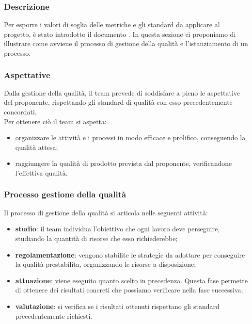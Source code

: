 \subsubsection{Descrizione}
Per esporre i valori di soglia delle metriche e gli standard da applicare al progetto, è stato introdotto il documento .
In questa sezione ci proponiamo di illustrare come avviene il processo di gestione della qualità e l'istanziamento di un processo.

\subsubsection{Aspettative}
Dalla gestione della qualità, il team prevede di soddisfare a pieno le aspettative del proponente, rispettando gli standard di qualità con esso  precedentemente concordati.\\
Per ottenere ciò il team si aspetta:
\begin{itemize}
    \item organizzare le attività e i processi in modo efficace e prolifico, conseguendo la qualità attesa;
    \item raggiungere la qualità di prodotto prevista dal proponente, verificandone l'effettiva qualità.
\end{itemize}


\subsubsection{Processo gestione della qualità}
Il processo di gestione della qualità si articola nelle seguenti attività:
\begin{itemize}
    \item\textbf{studio}: il team individua l'obiettivo che ogni lavoro deve perseguire, studiando la quantità di risorse che esso richiederebbe;
    \item \textbf{regolamentazione}: vengono stabilite le strategie da adottare per conseguire la qualità prestabilita, organizzando le risorse a disposizione;
    \item\textbf{attuazione}: viene eseguito quanto scelto in precedenza. Questa fase permette di ottenere dei risultati concreti che possiamo verificare nella fase successiva;
    \item\textbf{valutazione}: si verifica se i risultati ottenuti rispettano gli standard precedentemente richiesti.
\end{itemize}


